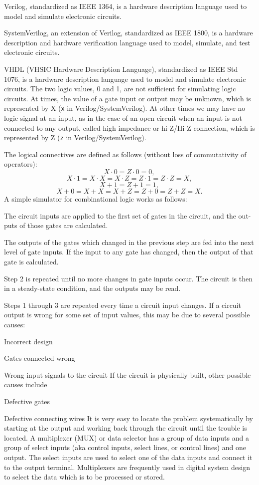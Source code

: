 \documentclass[a4paper,12pt]{report}
\begin{document}
Verilog, standardized as IEEE 1364, is a hardware description language used to model and simulate electronic circuits.

SystemVerilog, an extension of Verilog, standardized as IEEE 1800, is a hardware description and hardware verification language used to model, simulate, and test electronic circuits.

VHDL (VHSIC Hardware Description Language), standardized as IEEE Std 1076, is a hardware description language used to model and simulate electronic circuits.
The two logic values, 0 and 1, are not sufficient for simulating logic circuits. At times, the value of a gate input or output may be unknown, which is represented by X (\verb|x| in Verilog/SystemVerilog). At other times we may have no logic signal at an input, as in the case of an open circuit when an input is not connected to any output, called high impedance or hi-Z/Hi-Z connection, which is represented by Z (\verb|z| in Verilog/SystemVerilog).

The logical connectives are defined as follows (without loss of commutativity of operators):
\[X\cdot0=Z\cdot0=0,\]
\[X\cdot1=X\cdot X=X\cdot Z=Z\cdot1=Z\cdot Z=X,\]
\[X+1=Z+1=1,\]
\[X+0=X+X=X+Z=Z+0=Z+Z=X.\]
A simple simulator for combinational logic works as follows:
\ben
\item The circuit inputs are applied to the first set of gates in the circuit, and the out-puts of those gates are calculated.
\item The outputs of the gates which changed in the previous step are fed into the next level of gate inputs. If the input to any gate has changed, then the output of that gate is calculated.
\item Step 2 is repeated until no more changes in gate inputs occur. The circuit is then in a steady-state condition, and the outputs may be read.
\item Steps 1 through 3 are repeated every time a circuit input changes.
\een
If a circuit output is wrong for some set of input values, this may be due to several possible causes:
\bit
\item Incorrect design
\item Gates connected wrong
\item Wrong input signals to the circuit
\eit
If the circuit is physically built, other possible causes include
\bit
\item Defective gates
\item Defective connecting wires
\eit
It is very easy to locate the problem systematically by starting at the output and working back through the circuit until the trouble is located.
A multiplexer (MUX) or data selector has a group of data inputs and a group of select inputs (aka control inputs, select lines, or control lines) and one output. The select inputs are used to select one of the data inputs and connect it to the output terminal. Multiplexers are frequently used in digital system design to select the data which is to be processed or stored.
\end{document}
